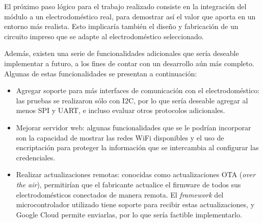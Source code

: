 El próximo paso lógico para el trabajo realizado consiste en la integración del módulo a un electrodoméstico real, para demostrar así el valor que aporta en un entorno más realista. Esto implicaría también el diseño y fabricación de un circuito impreso que se adapte al electrodoméstico seleccionado.

Además, existen una serie de funcionalidades adicionales que sería deseable implementar a futuro, a los fines de contar con un desarrollo aún más completo. Algunas de estas funcionalidades se presentan a continuación:

\begin{itemize}
	\item Agregar soporte para más interfaces de comunicación con el electrodoméstico: las pruebas se realizaron sólo con I2C, por lo que sería deseable agregar al menos SPI y UART, e incluso evaluar otros protocolos adicionales.
	\item Mejorar servidor web: algunas funcionalidades que se le podrían incorporar son la capacidad de mostrar las redes WiFi disponibles y el uso de encriptación para proteger la información que se intercambia al configurar las credenciales.
	\item Realizar actualizaciones remotas: conocidas como actualizaciones OTA (\emph{over the air}), permitirían que el fabricante actualice el firmware de todos sus electrodomésticos conectados de manera remota. El \emph{framework} del microcontrolador utilizado tiene soporte para recibir estas actualizaciones, y Google Cloud permite enviarlas, por lo que sería factible implementarlo.  
\end{itemize}











